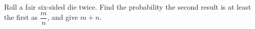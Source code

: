 Roll a fair six-sided die twice. Find the probability the second result is at least the first as $\dfrac{m}{n}$, and give $m+n$.
